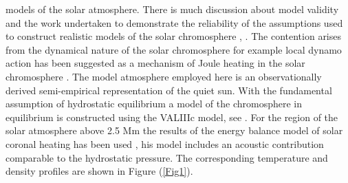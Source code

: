 \documentclass[preprint,authoryear,12pt]{elsarticle}
\begin{document}
models of the solar atmosphere. There is much discussion about model validity and the work undertaken to 
demonstrate the reliability of the assumptions used to construct realistic models of the solar chromosphere \citet{Carlsson1995}, \citet{Kalkofen2012}. The contention arises from the dynamical nature of the solar chromosphere for example local dynamo action has been suggested as a mechanism of Joule heating in the solar chromosphere \citet{Leenaarts2011}. The model atmosphere employed here is an observationally derived semi-empirical representation of the quiet sun. With the fundamental assumption of hydrostatic equilibrium a model of the chromosphere in equilibrium is constructed using the VALIIIc model, see \citet{Vernazza1981}. For the region of the solar atmosphere above 2.5 Mm the results of the energy balance model of solar coronal heating has been used \citep[see][]{McWhirter1975}, his model includes an acoustic contribution comparable to the hydrostatic pressure. The corresponding temperature and density profiles are shown in Figure (\ref{Fig1}).
\end{document}
